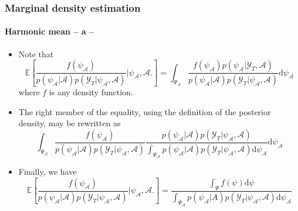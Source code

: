\documentclass[10pt,slidestop]{beamer}
\newcommand{\sample}{\mathcal Y_T}
\begin{document}
\begin{frame}
  \frametitle{Marginal density estimation}
  \framesubtitle{Harmonic mean -- a --}

    \begin{itemize}
        \item Note that
        {\tiny
            \[
                \mathbb{E}\left[\frac{f(\psi_{\mathcal A})}{p(\psi_{\mathcal A}|\mathcal A)
                p(\sample|\psi_{\mathcal A},\mathcal A)}\biggl|\psi_{\mathcal
A},\mathcal A\biggr.\right]
                = \int_{\Psi_{\mathcal A}}
                \frac{f(\psi_{\mathcal A})p(\psi_{\mathcal A}|\sample,\mathcal
A)}{p(\psi_{\mathcal A}|\mathcal A)
                p(\sample|\psi_{\mathcal A},\mathcal A)}\mathrm d\psi_{\mathcal A}
            \]
        }
        where $f$ is any density function.\newline

\bigskip

        \item The right member of the equality, using the definition of
        the posterior density, may be rewritten as
        {\tiny
            \[
                \int_{\Psi_{\mathcal A}}
                \frac{f(\psi_{\mathcal A})}{p(\psi_{\mathcal A}|\mathcal A)
                p(\sample|\psi_{\mathcal A},\mathcal A)}\frac{p(\psi_{\mathcal
A}|\mathcal A)p(\sample|\psi_{\mathcal A},\mathcal A)}
                {\int_{\Psi_{\mathcal A}}p(\psi_{\mathcal A}|\mathcal
A)p(\sample|\psi_{\mathcal A},\mathcal A)\mathrm d\psi_{\mathcal A}}\mathrm d\psi_{\mathcal A}
            \]
        }

\bigskip

        \item Finally, we have
        {\tiny
            \[
                \mathbb{E}\left[\frac{f(\psi_{\mathcal A})}{p(\psi_{\mathcal A}|\mathcal A)
                p(\sample|\psi_{\mathcal A},\mathcal A)}\biggl|\psi_{\mathcal
A},\mathcal A\biggr.\right]
                =
                \frac{\int_{\Psi}f(\psi)\mathrm d\psi}{\int_{\Psi_{\mathcal
A}}p(\psi_{\mathcal A}|A)
                p(\sample|\psi_{\mathcal A},\mathcal A)\mathrm d\psi_{\mathcal A}}
            \]
        }

    \end{itemize}
\end{frame}
\end{document}
